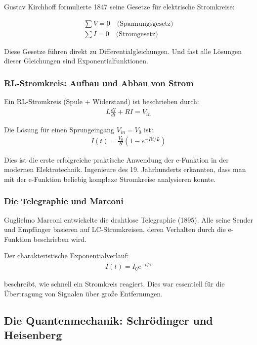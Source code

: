 \documentclass[a4paper,12pt,twoside]{report}
\theoremstyle{definition}
\begin{document}
Gustav Kirchhoff formulierte 1847 seine Gesetze für elektrische Stromkreise:

\begin{align}
	\sum V = 0 \quad \text{(Spannungsgesetz)}\\
	\sum I = 0 \quad \text{(Stromgesetz)}
\end{align}

Diese Gesetze führen direkt zu Differentialgleichungen. Und fast alle Lösungen dieser Gleichungen sind Exponentialfunktionen.

\subsubsection*{RL-Stromkreis: Aufbau und Abbau von Strom}

Ein RL-Stromkreis (Spule + Widerstand) ist beschrieben durch:
\begin{align}
	L \frac{dI}{dt} + R I = V_{in}
\end{align}

Die Lösung für einen Sprungeingang $V_{in} = V_0$ ist:
\begin{align}
	I(t) = \frac{V_0}{R} (1 - e^{-Rt/L})
\end{align}

Dies ist die erste erfolgreiche praktische Anwendung der e-Funktion in der modernen Elektrotechnik. Ingenieure des 19. Jahrhunderts erkannten, dass man mit der e-Funktion beliebig komplexe Stromkreise analysieren konnte.

\subsubsection*{Die Telegraphie und Marconi}

Guglielmo Marconi entwickelte die drahtlose Telegraphie (1895). Alle seine Sender und Empfänger basieren auf LC-Stromkreisen, deren Verhalten durch die e-Funktion beschrieben wird.

Der charakteristische Exponentialverlauf:
\begin{align}
	I(t) = I_0 e^{-t/\tau}
\end{align}

beschreibt, wie schnell ein Stromkreis reagiert. Dies war essentiell für die Übertragung von Signalen über große Entfernungen.

\subsection{Die Quantenmechanik: Schrödinger und Heisenberg}
\end{document}

